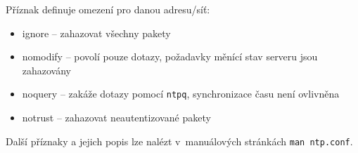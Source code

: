 Příznak definuje omezení pro danou adresu/síť:
\begin{itemize}
  \item ignore -- zahazovat všechny pakety
  \item nomodify -- povolí pouze dotazy, požadavky měnící stav serveru jsou zahazovány
  \item noquery -- zakáže dotazy pomocí {\tt ntpq}, synchronizace času není ovlivněna
  \item notrust -- zahazovat neautentizované pakety
\end{itemize}
Další příznaky a jejich popis lze nalézt v~manuálových stránkách {\tt man ntp.conf}.

  
